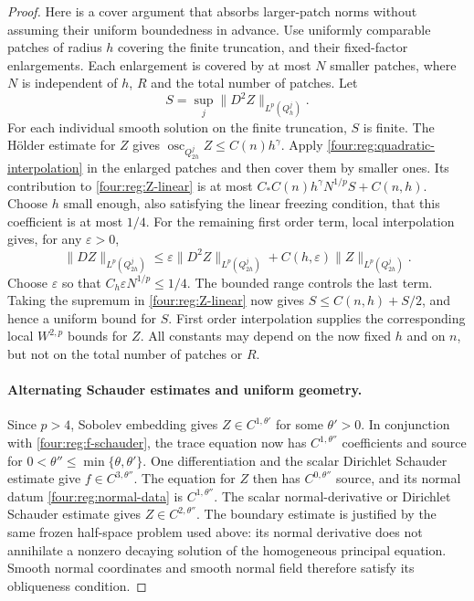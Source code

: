 \begin{proof}
Here is a cover argument that absorbs larger-patch norms without
assuming their uniform boundedness in advance.  Use uniformly
comparable patches of radius $h$ covering the finite truncation,
and their fixed-factor enlargements.  Each enlargement is covered
by at most $N$ smaller patches, where $N$ is independent of $h$,
$R$ and the total number of patches.  Let
\[
 S=\sup_j\|D^2Z\|_{L^p(Q_h^j)}.
\]
For each individual smooth solution on the finite truncation,
$S$ is finite.  The H\"older estimate for $Z$ gives
$\operatorname{osc}_{Q_{2h}^j}Z\le C(n)h^\gamma$.
Apply \eqref{four:reg:quadratic-interpolation} in the enlarged patches
and then cover them by smaller ones.  Its contribution to
\eqref{four:reg:Z-linear} is at most
$C_*C(n)h^\gamma N^{1/p}S+C(n,h)$.
Choose $h$ small enough, also satisfying the linear freezing
condition, that this coefficient is at most $1/4$.
For the remaining first order term, local interpolation gives,
for any $\varepsilon>0$,
\[
 \|DZ\|_{L^p(Q_{2h}^j)}
 \le\varepsilon\|D^2Z\|_{L^p(Q_{2h}^j)}
                   +C(h,\varepsilon)\|Z\|_{L^p(Q_{2h}^j)}.
\]
Choose $\varepsilon$ so that $C_h\varepsilon N^{1/p}\le1/4$.
The bounded range controls the last term.  Taking the supremum
in \eqref{four:reg:Z-linear} now gives
$S\le C(n,h)+S/2$, and hence a uniform bound for $S$.
First order interpolation supplies the corresponding local
$W^{2,p}$ bounds for $Z$.  All constants may depend on the now
fixed $h$ and on $n$, but not on the total number of patches or $R$.

\paragraph{Alternating Schauder estimates and uniform geometry.}
Since $p>4$, Sobolev embedding gives $Z\in C^{1,\theta'}$ for
some $\theta'>0$.  In conjunction with \eqref{four:reg:f-schauder},
the trace equation now has $C^{1,\theta''}$ coefficients and source
for $0<\theta''\le\min\{\theta,\theta'\}$.  One differentiation
and the scalar Dirichlet Schauder estimate give
$f\in C^{3,\theta''}$.  The equation for $Z$ then has
$C^{0,\theta''}$ source, and its normal datum
\eqref{four:reg:normal-data} is $C^{1,\theta''}$.
The scalar normal-derivative or Dirichlet Schauder estimate gives
$Z\in C^{2,\theta''}$.  The boundary estimate is justified by the
same frozen half-space problem used above: its normal derivative
does not annihilate a nonzero decaying solution of the homogeneous
principal equation.  Smooth normal coordinates and smooth normal
field therefore satisfy its obliqueness condition.


\end{proof}
